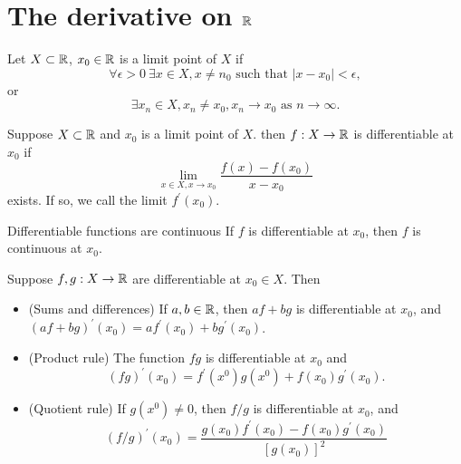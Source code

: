 \documentclass[twoside]{article}
\begin{document}
\section{The derivative on $\mathbb{R}$}

\begin{definition}
	Let $X \subset \mathbb{R}$, $x_{0} \in \mathbb{R} $ is a limit point of $X$ if
	\begin{equation*}
		\forall \epsilon > 0 \ \exists x \in X, x \neq n_{0} \text{ such that } | x - x_{0} | < \epsilon,
	\end{equation*}
	or
	\begin{equation*}
		\exists x_{n } \in X, x_{n } \neq x_{0}, x_{n } \to x_{0} \text{ as } n \to \infty.
	\end{equation*}
\end{definition}

\begin{definition}
	Suppose $X \subset \mathbb{R} $ and $x_{0}$ is a limit point of $X$. then $f : X \to \mathbb{R} $ is differentiable at $x_{0}$ if
	\begin{equation*}
		\lim_{x \in X, x \to x_{0}} \frac{f(x) - f(x_{0})}{x - x_{0}}
	\end{equation*}
	exists. If so, we call the limit $f^{\prime}(x_{0})$.
\end{definition}

\begin{theorem}{Differentiable functions are continuous}
	If $f$ is differentiable at $x_{0}$, then $f$ is continuous at $x_{0}$.
\end{theorem}

\begin{theorem}
	Suppose $f, g : X \to \mathbb{R} $ are differentiable at $x_{0} \in X$. Then
	\begin{itemize}
		\item (Sums and differences) If $a, b \in \mathbb{R}$, then $af + bg $ is differentiable at $x_{0}$, and
		      $(af + bg )^{\prime}(x_{0}) = af^{\prime}(x_{0}) + bg^{\prime}(x_{0})$.
		\item (Product rule) The function $fg $ is differentiable at $x_{0}$ and
		      \begin{equation*}
			      (fg )^{\prime}(x_{0}) = f^{\prime }(x^{0})g(x^{0}) + f(x_{0})g^{\prime}(x_{0}).
		      \end{equation*}
		\item (Quotient rule) If $g(x^{0}) \neq 0$, then $f / g$ is differentiable at $x_{0}$, and
		      \begin{equation*}
			      (f/g)^{\prime }(x_{0}) = \frac{g(x_{0})f^{\prime}(x_{0}) - f(x_{0})g^{\prime}(x_{0})}{[g(x_{0})]^{2}}
		      \end{equation*}
	\end{itemize}
\end{theorem}
\end{document}
